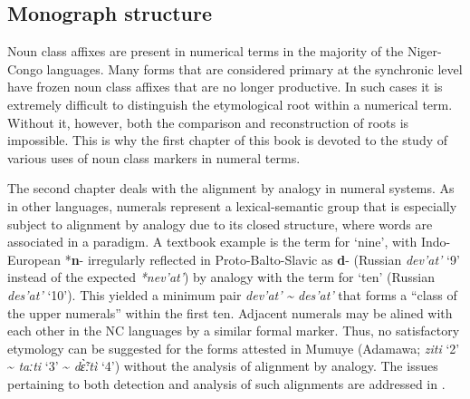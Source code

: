 \subsection{Monograph structure}
Noun class affixes are present in numerical terms in the majority of the Niger-Congo languages. Many forms that are considered primary at the synchronic level have frozen noun class affixes that are no longer productive. In such cases it is extremely difficult to distinguish the etymological root within a numerical term. Without it, however, both the comparison and reconstruction of roots is impossible. This is why the first chapter of this book is devoted to the study of various uses of noun class markers in numeral terms.

The second chapter deals with the alignment by analogy in numeral systems. As in other languages, numerals represent a lexical-semantic group that is especially subject to alignment by analogy due to its closed structure, where words are associated in a paradigm. A textbook example is the term for ‘nine’, with Indo-European *\textbf{n}{}- irregularly reflected in Proto-Balto-Slavic as \textbf{d}{}- (Russian \textit{dev’at’} ‘9’ instead of the expected \textit{*nev’at’}) by analogy with the term for ‘ten’ (Russian \textit{des’at’} ‘10’). This yielded a minimum pair \textit{dev’at’} \textit{{\textasciitilde} des’at’} that forms a “class of the upper numerals” within the first ten. Adjacent numerals may be alined with each other in the NC languages by a similar formal marker. Thus, no satisfactory etymology can be suggested for the forms attested in Mumuye (Adamawa; \textit{ziti} ‘2’ {\textasciitilde} \textit{taːti} ‘3’ {\textasciitilde} \textit{d{\~{\`ɛ}}ːt{\`{i}}} ‘4’) without the analysis of alignment by analogy. The issues pertaining to both detection and analysis of such alignments are addressed in .

